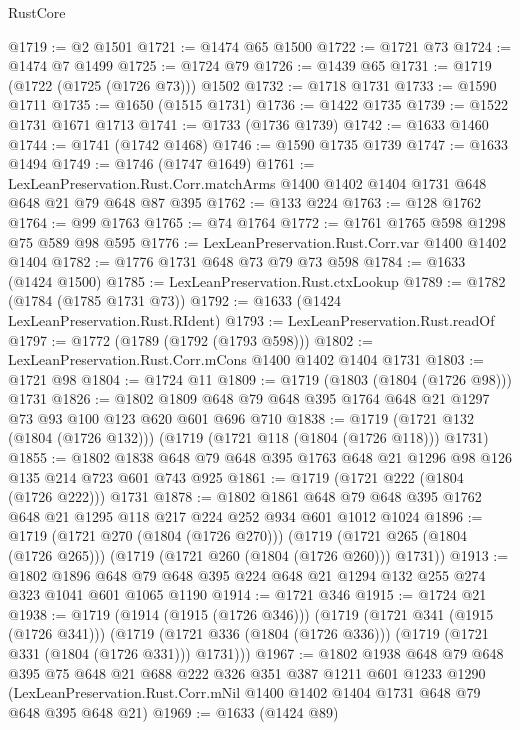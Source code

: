 \begin{lexlean}{RustCore}
\begin{coremodule}
@1719 := @2 @1501
@1721 := @1474 @65 @1500
@1722 := @1721 @73
@1724 := @1474 @7 @1499
@1725 := @1724 @79
@1726 := @1439 @65
@1731 := @1719 (@1722 (@1725 (@1726 @73))) @1502
@1732 := @1718 @1731
@1733 := @1590 @1711
@1735 := @1650 (@1515 @1731)
@1736 := @1422 @1735
@1739 := @1522 @1731 @1671 @1713
@1741 := @1733 (@1736 @1739)
@1742 := @1633 @1460
@1744 := @1741 (@1742 @1468)
@1746 := @1590 @1735 @1739
@1747 := @1633 @1494
@1749 := @1746 (@1747 @1649)
@1761 := LexLeanPreservation.Rust.Corr.matchArms
    @1400
    @1402
    @1404
    @1731
    @648
    @648
    @21
    @79
    @648
    @87
    @395
@1762 := @133 @224
@1763 := @128 @1762
@1764 := @99 @1763
@1765 := @74 @1764
@1772 := @1761 @1765 @598 @1298 @75 @589 @98 @595
@1776 := LexLeanPreservation.Rust.Corr.var @1400 @1402 @1404
@1782 := @1776 @1731 @648 @73 @79 @73 @598
@1784 := @1633 (@1424 @1500)
@1785 := LexLeanPreservation.Rust.ctxLookup
@1789 := @1782 (@1784 (@1785 @1731 @73))
@1792 := @1633 (@1424 LexLeanPreservation.Rust.RIdent)
@1793 := LexLeanPreservation.Rust.readOf
@1797 := @1772 (@1789 (@1792 (@1793 @598)))
@1802 := LexLeanPreservation.Rust.Corr.mCons @1400 @1402 @1404 @1731
@1803 := @1721 @98
@1804 := @1724 @11
@1809 := @1719 (@1803 (@1804 (@1726 @98))) @1731
@1826 := @1802 @1809 @648 @79 @648 @395 @1764 @648 @21 @1297 @73 @93 @100 @123 @620 @601 @696 @710
@1838 := @1719 (@1721 @132 (@1804 (@1726 @132))) (@1719 (@1721 @118 (@1804 (@1726 @118))) @1731)
@1855 := @1802 @1838 @648 @79 @648 @395 @1763 @648 @21 @1296 @98 @126 @135 @214 @723 @601 @743 @925
@1861 := @1719 (@1721 @222 (@1804 (@1726 @222))) @1731
@1878 := @1802
    @1861
    @648
    @79
    @648
    @395
    @1762
    @648
    @21
    @1295
    @118
    @217
    @224
    @252
    @934
    @601
    @1012
    @1024
@1896 := @1719
    (@1721 @270 (@1804 (@1726 @270)))
    (@1719 (@1721 @265 (@1804 (@1726 @265))) (@1719 (@1721 @260 (@1804 (@1726 @260))) @1731))
@1913 := @1802
    @1896
    @648
    @79
    @648
    @395
    @224
    @648
    @21
    @1294
    @132
    @255
    @274
    @323
    @1041
    @601
    @1065
    @1190
@1914 := @1721 @346
@1915 := @1724 @21
@1938 := @1719
    (@1914 (@1915 (@1726 @346)))
    (@1719
      (@1721 @341 (@1915 (@1726 @341)))
      (@1719 (@1721 @336 (@1804 (@1726 @336))) (@1719 (@1721 @331 (@1804 (@1726 @331))) @1731)))
@1967 := @1802
    @1938
    @648
    @79
    @648
    @395
    @75
    @648
    @21
    @688
    @222
    @326
    @351
    @387
    @1211
    @601
    @1233
    @1290
    (LexLeanPreservation.Rust.Corr.mNil @1400 @1402 @1404 @1731 @648 @79 @648 @395 @648 @21)
@1969 := @1633 (@1424 @89)

\end{coremodule}
\end{lexlean}
